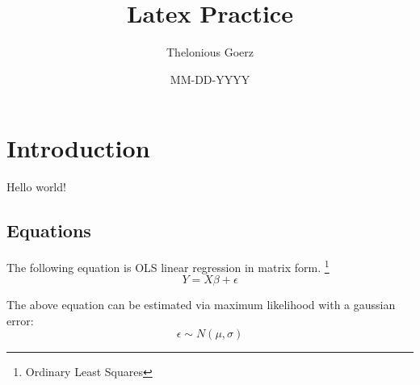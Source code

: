 \documentclass[12pt]{article}
\title{Latex Practice}
\author{Thelonious Goerz}
\date{MM-DD-YYYY}
\begin{document}
\maketitle

\section{Introduction}

Hello world! 

\subsection{Equations}

The following equation is OLS linear regression in matrix form. \footnote{Ordinary Least Squares}
\begin{equation}
Y = X\beta + \epsilon
\end{equation}

The above equation can be estimated via maximum likelihood with a gaussian error: 
\begin{equation}
\epsilon \sim N(\mu,\sigma)
\end{equation}
\end{document}
